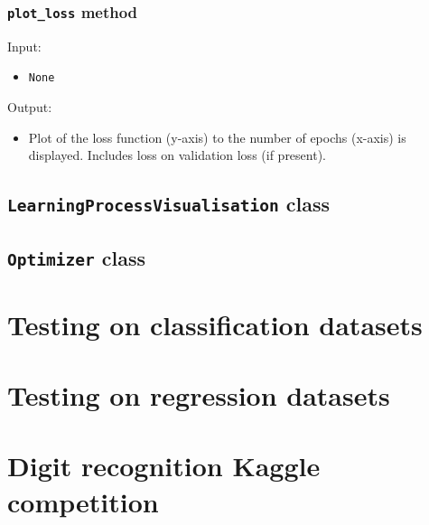 \documentclass[a4]{article}
\begin{document}
\subsubsection{\texttt{plot\_loss} method}
Input:
\begin{itemize}
	\item \texttt{None} 
\end{itemize}
Output:
\begin{itemize}
	\item Plot of the loss function (y-axis) to the number of epochs (x-axis) is displayed. Includes loss on validation loss (if present). 
\end{itemize}


\subsection{\texttt{LearningProcessVisualisation} class}


\subsection{\texttt{Optimizer} class}

\newpage
\section{Testing on classification datasets}

\newpage
\section{Testing on regression datasets}

\newpage
\section{Digit recognition Kaggle competition}
\end{document}
